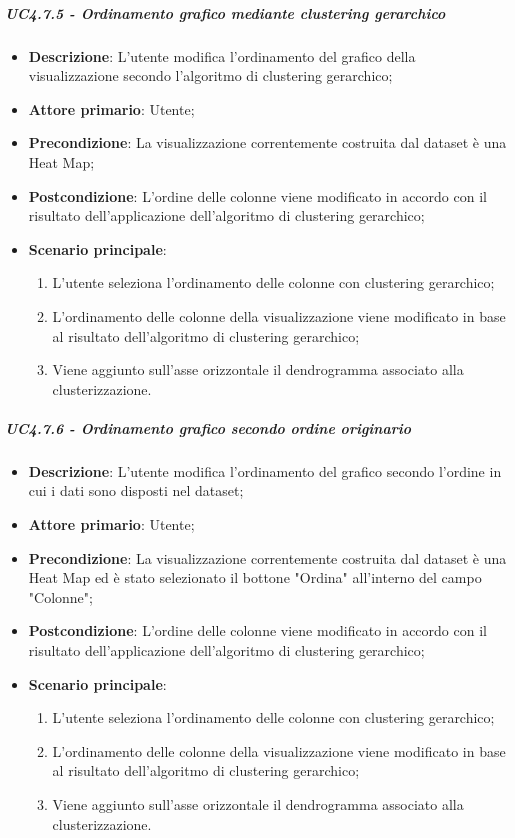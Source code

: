 \subparagraph{UC4.7.5 - Ordinamento grafico mediante clustering gerarchico}
\label{spar:uc4.7.5}
\begin{itemize}
    \item \textbf{Descrizione}:     L'utente modifica l'ordinamento del grafico  della visualizzazione secondo l'algoritmo di clustering gerarchico;
    \item \textbf{Attore primario}: Utente;
    \item \textbf{Precondizione}:   La visualizzazione correntemente costruita dal dataset è una Heat Map;
    \item \textbf{Postcondizione}:  L'ordine delle colonne viene modificato in accordo con il risultato dell'applicazione dell'algoritmo di clustering gerarchico;
    \item \textbf{Scenario principale}:
    \begin{enumerate}
        \item L'utente seleziona l'ordinamento delle colonne con clustering gerarchico;
        \item L'ordinamento delle colonne della visualizzazione viene modificato in base al risultato dell'algoritmo di clustering gerarchico;
        \item Viene aggiunto sull'asse orizzontale il dendrogramma associato alla clusterizzazione.
    \end{enumerate}
\end{itemize}

\subparagraph{UC4.7.6 - Ordinamento grafico secondo ordine originario }
\label{spar:uc4.7.6}
\begin{itemize}
    \item \textbf{Descrizione}:     L'utente modifica l'ordinamento del grafico secondo l'ordine in cui i dati sono disposti nel dataset;
    \item \textbf{Attore primario}: Utente;
    \item \textbf{Precondizione}:   La visualizzazione correntemente costruita dal dataset è una Heat Map ed è stato selezionato il bottone "Ordina" all'interno del campo "Colonne";
    \item \textbf{Postcondizione}:  L'ordine delle colonne viene modificato in accordo con il risultato dell'applicazione dell'algoritmo di clustering gerarchico;
    \item \textbf{Scenario principale}:
    \begin{enumerate}
        \item L'utente seleziona l'ordinamento delle colonne con clustering gerarchico;
        \item L'ordinamento delle colonne della visualizzazione viene modificato in base al risultato dell'algoritmo di clustering gerarchico;
        \item Viene aggiunto sull'asse orizzontale il dendrogramma associato alla clusterizzazione.
    \end{enumerate}
\end{itemize}



